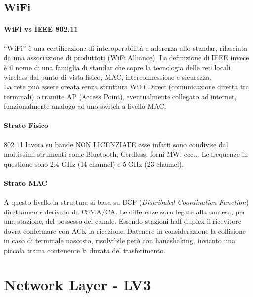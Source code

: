 \documentclass[12pt]{article}
\begin{document}
\subsection{WiFi}
\paragraph{WiFi vs IEEE 802.11}
``WiFi'' è una certificazione di interoperabilità e aderenza allo standar, rilasciata da una associazione di produttoti (WiFi Alliance). La definizione di IEEE invece è il nome di una famiglia di standar che copre la tecnologia delle reti locali wireless dal punto di vista fisico, MAC, interconnessione e sicurezza.\\
La rete può essere creata senza struttura WiFi Direct (comunicazione diretta tra terminali) o tramite AP (Access Point), eventualmente collegato ad internet, funzionalmente analogo ad uno switch a livello MAC.
\paragraph{Strato Fisico}
802.11 lavora su bande NON LICENZIATE esse infatti sono condivise dal moltissimi strumenti come Bluetooth, Cordless, forni MW, ecc... Le frequenze in questione sono 2.4 GHz (14 channel) e 5 GHz (23 channel).
\paragraph{Strato MAC}
A questo livello la struttura si basa su DCF (\textit{Distributed Coordination Function}) direttamente derivato da CSMA/CA. Le differenze sono legate alla contesa, per una stazione, del possesso del canale. Essendo stazioni half-duplex il ricevitore dovra confermare con ACK la ricezione. Datenere in considerazione la collisione in caso di terminale nascosto, risolvibile però con handshaking, invianto una piccola trama contenente la durata del trasferimento.


\section{Network Layer - LV3} \label{LV3}



\end{document}
